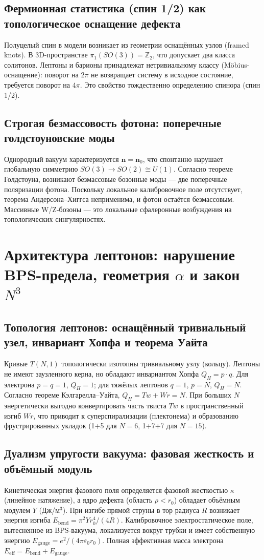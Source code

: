 \documentclass[11pt,a4paper]{article}
\begin{document}
	\subsection{Фермионная статистика (спин 1/2) как топологическое оснащение дефекта}
	Полуцелый спин в модели возникает из геометрии оснащённых узлов (framed knots). В 3D-пространстве $\pi_1(SO(3))=\mathbb{Z}_2$, что допускает два класса солитонов. Лептоны и барионы принадлежат нетривиальному классу (Möbius-оснащение): поворот на $2\pi$ не возвращает систему в исходное состояние, требуется поворот на $4\pi$. Это свойство тождественно определению спинора (спин 1/2).
	
	\subsection{Строгая безмассовость фотона: поперечные голдстоуновские моды}
	Однородный вакуум характеризуется $\mathbf{n}=\mathbf{n}_0$, что спонтанно нарушает глобальную симметрию $SO(3)\to SO(2)\cong U(1)$. Согласно теореме Голдстоуна, возникают безмассовые бозонные моды — две поперечные поляризации фотона. Поскольку локальное калибровочное поле отсутствует, теорема Андерсона–Хиггса неприменима, и фотон остаётся безмассовым. Массивные W/Z-бозоны — это локальные сфалеронные возбуждения на топологических сингулярностях.
	
	\section{Архитектура лептонов: нарушение BPS-предела, геометрия $\alpha$ и закон $N^3$}
	
	\subsection{Топология лептонов: оснащённый тривиальный узел, инвариант Хопфа и теорема Уайта}
	Кривые $T(N,1)$ топологически изотопны тривиальному узлу (кольцу). Лептоны не имеют заузленного керна, но обладают инвариантом Хопфа $Q_H = p\cdot q$. Для электрона $p=q=1$, $Q_H=1$; для тяжёлых лептонов $q=1$, $p=N$, $Q_H=N$. Согласно теореме Кэлгарелла–Уайта, $Q_H = Tw + Wr = N$. При больших $N$ энергетически выгодно конвертировать часть твиста $Tw$ в пространственный изгиб $Wr$, что приводит к суперспирализации (плектонема) и образованию фрустрированных укладок (1+5 для $N=6$, 1+7+7 для $N=15$).
	
	\subsection{Дуализм упругости вакуума: фазовая жесткость и объёмный модуль}
	Кинетическая энергия фазового поля определяется фазовой жесткостью $\kappa$ (линейное натяжение), а ядро дефекта (область $\rho<r_0$) обладает объёмным модулем $Y$ (Дж/м$^3$). При изгибе прямой струны в тор радиуса $R$ возникает энергия изгиба $E_{\text{bend}} = \pi^2 Y r_0^4/(4R)$. Калибровочное электростатическое поле, вытесненное из BPS-вакуума, локализуется вокруг трубки и имеет собственную энергию $E_{\text{gauge}} = e^2/(4\pi\varepsilon_0 r_0)$. Полная эффективная масса электрона $E_{\text{eff}}=E_{\text{bend}}+E_{\text{gauge}}$.
	
\end{document}
